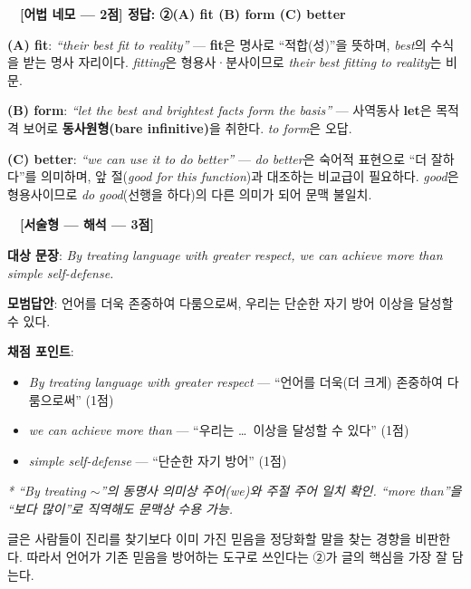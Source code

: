 \documentclass[11pt,a4paper]{article}
\newcommand{\qno}[1]{\par\vspace{10pt}\noindent{\sffamily\bfseries #1.}\ }
\begin{document}
\bigskip

\qno{2}\ \textbf{[어법 네모 --- 2점] 정답: ②\quad (A) fit \quad (B) form \quad (C) better}

\vspace{4pt}
\noindent\textbf{(A) fit}: \textit{``their best fit to reality''} --- \textbf{fit}은 명사로 ``적합(성)''을 뜻하며, \textit{best}의 수식을 받는 명사 자리이다. \textit{fitting}은 형용사·분사이므로 \textit{their best fitting to reality}는 비문.

\vspace{4pt}
\noindent\textbf{(B) form}: \textit{``let the best and brightest facts form the basis''} --- 사역동사 \textbf{let}은 목적격 보어로 \textbf{동사원형(bare infinitive)}을 취한다. \textit{to form}은 오답.

\vspace{4pt}
\noindent\textbf{(C) better}: \textit{``we can use it to do better''} --- \textit{do better}은 숙어적 표현으로 ``더 잘하다''를 의미하며, 앞 절(\textit{good for this function})과 대조하는 비교급이 필요하다. \textit{good}은 형용사이므로 \textit{do good}(선행을 하다)의 다른 의미가 되어 문맥 불일치.

\bigskip

\qno{3}\ \textbf{[서술형 --- 해석 --- 3점]}

\vspace{4pt}
\noindent\textbf{대상 문장}: \textit{By treating language with greater respect, we can achieve more than simple self-defense.}

\vspace{6pt}
\begin{pbox}
\textbf{모범답안}: 언어를 더욱 존중하여 다룸으로써, 우리는 단순한 자기 방어 이상을 달성할 수 있다.
\end{pbox}

\vspace{6pt}
\noindent\textbf{채점 포인트}:
\begin{itemize}[leftmargin=2em,itemsep=1pt,topsep=2pt]
  \item \textit{By treating language with greater respect} --- ``언어를 더욱(더 크게) 존중하여 다룸으로써'' (1점)
  \item \textit{we can achieve more than} --- ``우리는 \ldots\ 이상을 달성할 수 있다'' (1점)
  \item \textit{simple self-defense} --- ``단순한 자기 방어'' (1점)
\end{itemize}

\vspace{4pt}
\noindent\textit{* ``By treating $\sim$''의 동명사 의미상 주어(we)와 주절 주어 일치 확인. ``more than''을 ``보다 많이''로 직역해도 문맥상 수용 가능.}

\vspace{8pt}
\par 글은 사람들이 진리를 찾기보다 이미 가진 믿음을 정당화할 말을 찾는 경향을 비판한다. 따라서 언어가 기존 믿음을 방어하는 도구로 쓰인다는 ②가 글의 핵심을 가장 잘 담는다.
\end{document}
